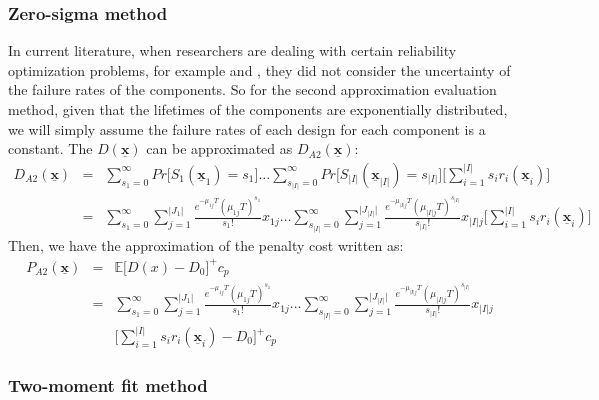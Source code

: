 \documentclass[preprint,12pt]{elsarticle}
\begin{document}
\subsubsection{Zero-sigma method}
In current literature, when researchers are dealing with certain reliability optimization problems, for example \citet{Mettas} \citet{Oner2010} and \citet{Huang}, they did not consider the uncertainty of the failure rates of the components. So for the second approximation evaluation method, given that the lifetimes of the components are exponentially distributed, we will simply assume the failure rates of each design for each component is a constant. The $D(\boldsymbol{\underline{x}})$ can be approximated as $D_{A2}(\boldsymbol{\underline{x}})$:
\small
\begin{eqnarray}
D_{A2}(\boldsymbol{\underline{x}}) &=& \sum_{s_{1}=0}^{\infty}Pr\bigg[S_{1}(\underline{\boldsymbol{x}}_{1})=s_{1}\bigg]\dots  \sum_{s_{\lvert I \rvert}=0}^{\infty}
Pr\bigg[S_{\lvert I \rvert}(\underline{\boldsymbol{x}}_{\lvert I \rvert})=s_{\lvert I \rvert}\bigg]\bigg[\sum_{i=1}^{\rvert I \lvert}s_{i}r_{i}(\boldsymbol{\underline{x}}_{i})\bigg] \nonumber\\
&=& \sum_{s_{1}=0}^{\infty}\sum_{j=1}^{\rvert J_{1}\lvert}{\frac{e^{-\mu_{1j}T}(\mu_{1j}T)^{s_{1}}}{s_{1}!}x_{1j}} \dots \sum_{s_{\rvert I \lvert}=0}^{\infty}\sum_{j=1}^{\rvert J_{\rvert I \lvert}\lvert}{\frac{e^{-\mu_{\rvert I \lvert j}T}(\mu_{\rvert I \lvert j}T)^{s_{\rvert I \lvert}}}{s_{\rvert I \lvert}!}x_{\rvert I \lvert j}}\bigg[\sum_{i=1}^{\rvert I \lvert}s_{i}r_{i}(\boldsymbol{\underline{x}}_{i})\bigg]
\end{eqnarray}
\normalsize
Then, we have the approximation of the penalty cost written as:
\small
\begin{eqnarray}
P_{A2}(\boldsymbol{\underline{x}}) &=& \mathbb{E}\bigg[D(x)-D_{0}\bigg]^{+}c_p \nonumber\\
&=& \sum_{s_{1}=0}^{\infty}\sum_{j=1}^{\rvert J_{1}\lvert}{\frac{e^{-\mu_{1j}T}(\mu_{1j}T)^{s_{1}}}{s_{1}!}x_{1j}} \dots \sum_{s_{\rvert I \lvert}=0}^{\infty}\sum_{j=1}^{\rvert J_{\rvert I \lvert}\lvert}{\frac{e^{-\mu_{\rvert I \lvert j}T}(\mu_{\rvert I \lvert j}T)^{s_{\rvert I \lvert}}}{s_{\rvert I \lvert}!}x_{\rvert I \lvert j}} \nonumber\\
&& \bigg[\sum_{i=1}^{\rvert I \lvert}s_{i}r_{i}(\boldsymbol{\underline{x}}_{i})-D_{0}\bigg]^{+}c_{p}
\end{eqnarray}
\normalsize
\subsubsection{Two-moment fit method}
\end{document}
